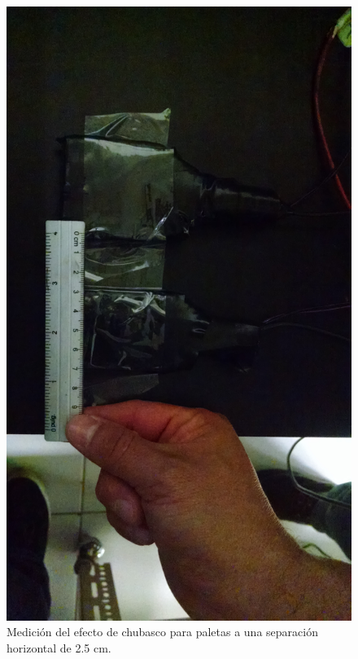 \documentclass[a4paper,10pt]{article}
\numberwithin{equation}{section}
\begin{document}
\begin{figure}[H]
 \center 
 \includegraphics[scale=0.08]{Imagenes/chubasco2}
 \caption{Medición del efecto de chubasco para paletas a una separación horizontal 
 de 2.5 cm.}
\end{figure}
\end{document}
